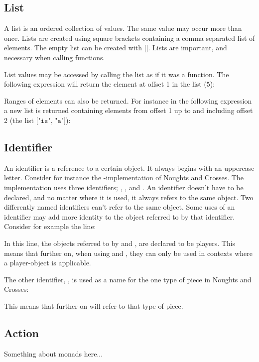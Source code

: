 \subsection{List}
A list is an ordered collection of values. The same value may occur more than once. Lists are created using square brackets containing a comma separated list of elements. The empty list can be created with $\texttt{[]}$. Lists are important, and necessary when calling functions.

List values may be accessed by calling the list as if it was a function.
The following expression will return the element at offset 1 in the list
($5$):


Ranges of elements can also be returned. For instance in the following
expression a new list is returned containing elements from offset 1 up
to and including offset 2 (the list $\texttt{["is", "a"]}$):


\subsection{Identifier}
An identifier is a reference to a certain object. It always begins with an uppercase letter.
Consider for instance the \productname-implementation
of Noughts and Crosses. The implementation uses three identifiers; ,
, and . An identifier doesn't have to be declared, and no matter
where it is used, it always refers to the same object. Two differently named identifiers can't refer
to the same object. Some uses of an identifier may add more identity to the object referred to by that
identifier. Consider for example the line:


In this line, the objects referred to by  and , are declared
to be players. This means that further on, when using  and ,
they can only be used in contexts where a player-object is applicable.

The other identifier, , is used as a name for the one type of piece in
Noughts and Crosses:


This means that further on  will refer to that type of piece.


\subsection{Action}

Something about monads here...
